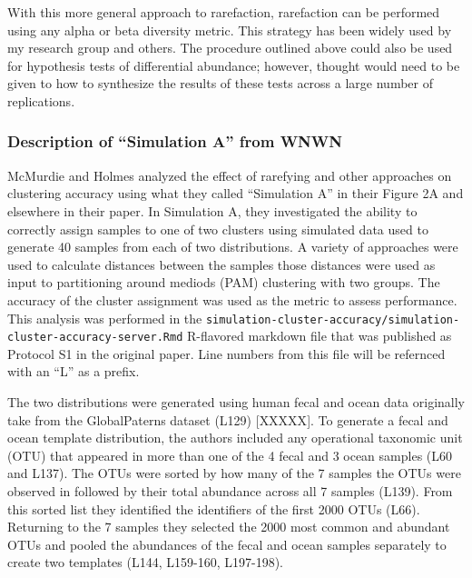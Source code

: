 \documentclass[
]{article}
\begin{document}
With this more general approach to rarefaction, rarefaction can be
performed using any alpha or beta diversity metric. This strategy has
been widely used by my research group and others. The procedure outlined
above could also be used for hypothesis tests of differential abundance;
however, thought would need to be given to how to synthesize the results
of these tests across a large number of replications.

\hypertarget{description-of-simulation-a-from-wnwn}{%
\subsubsection{Description of ``Simulation A'' from
WNWN}\label{description-of-simulation-a-from-wnwn}}

McMurdie and Holmes analyzed the effect of rarefying and other
approaches on clustering accuracy using what they called ``Simulation
A'' in their Figure 2A and elsewhere in their paper. In Simulation A,
they investigated the ability to correctly assign samples to one of two
clusters using simulated data used to generate 40 samples from each of
two distributions. A variety of approaches were used to calculate
distances between the samples those distances were used as input to
partitioning around mediods (PAM) clustering with two groups. The
accuracy of the cluster assignment was used as the metric to assess
performance. This analysis was performed in the
\texttt{simulation-cluster-accuracy/simulation-cluster-accuracy-server.Rmd}
R-flavored markdown file that was published as Protocol S1 in the
original paper. Line numbers from this file will be refernced with an
``L'' as a prefix.

The two distributions were generated using human fecal and ocean data
originally take from the GlobalPaterns dataset (L129) {[}XXXXX{]}. To
generate a fecal and ocean template distribution, the authors included
any operational taxonomic unit (OTU) that appeared in more than one of
the 4 fecal and 3 ocean samples (L60 and L137). The OTUs were sorted by
how many of the 7 samples the OTUs were observed in followed by their
total abundance across all 7 samples (L139). From this sorted list they
identified the identifiers of the first 2000 OTUs (L66). Returning to
the 7 samples they selected the 2000 most common and abundant OTUs and
pooled the abundances of the fecal and ocean samples separately to
create two templates (L144, L159-160, L197-198).
\end{document}

